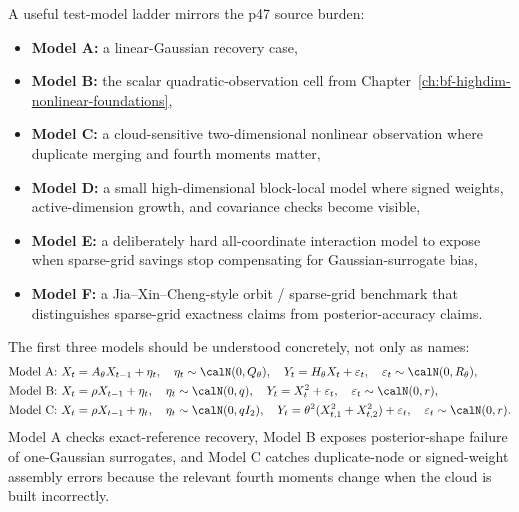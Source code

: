 A useful test-model ladder mirrors the p47 source burden:
\begin{itemize}[leftmargin=0.28in]
  \item \textbf{Model A:} a linear-Gaussian recovery case,
  \item \textbf{Model B:} the scalar quadratic-observation cell from
  Chapter~\ref{ch:bf-highdim-nonlinear-foundations},
  \item \textbf{Model C:} a cloud-sensitive two-dimensional nonlinear observation
  where duplicate merging and fourth moments matter,
  \item \textbf{Model D:} a small high-dimensional block-local model where signed
  weights, active-dimension growth, and covariance checks become visible,
  \item \textbf{Model E:} a deliberately hard all-coordinate interaction model to
  expose when sparse-grid savings stop compensating for Gaussian-surrogate bias,
  \item \textbf{Model F:} a Jia--Xin--Cheng-style orbit / sparse-grid benchmark
  that distinguishes sparse-grid exactness claims from posterior-accuracy claims.
\end{itemize}
The first three models should be understood concretely, not only as names:
\begin{align}
  \text{Model A: }&
  X_t=A_\theta X_{t-1}+\eta_t,
  \quad
  \eta_t\sim\calN(0,Q_\theta),
  \quad
  Y_t=H_\theta X_t+\varepsilon_t,
  \quad
  \varepsilon_t\sim\calN(0,R_\theta),
  \label{eq:bf-hd-sgqf-model-A}\\
  \text{Model B: }&
  X_t=\rho X_{t-1}+\eta_t,
  \quad
  \eta_t\sim\calN(0,q),
  \quad
  Y_t=X_t^2+\varepsilon_t,
  \quad
  \varepsilon_t\sim\calN(0,r),
  \label{eq:bf-hd-sgqf-model-B}\\
  \text{Model C: }&
  X_t=\rho X_{t-1}+\eta_t,
  \quad
  \eta_t\sim\calN(0,qI_2),
  \quad
  Y_t=\theta^2(X_{t,1}^2+X_{t,2}^2)+\varepsilon_t,
  \quad
  \varepsilon_t\sim\calN(0,r).
  \label{eq:bf-hd-sgqf-model-C}
\end{align}
Model A checks exact-reference recovery, Model B exposes posterior-shape failure
of one-Gaussian surrogates, and Model C catches duplicate-node or signed-weight
assembly errors because the relevant fourth moments change when the cloud is
built incorrectly.

